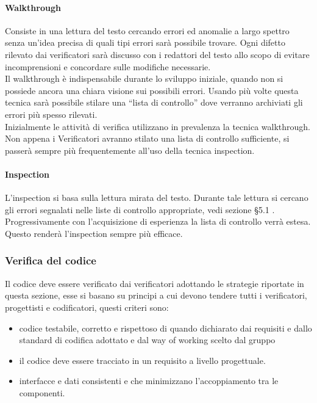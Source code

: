 			\paragraph{Walkthrough}
				Consiste in una lettura del testo cercando errori ed anomalie a largo spettro senza un’idea precisa di quali tipi errori sarà possibile trovare. Ogni difetto rilevato dai verificatori sarà discusso con i redattori del testo allo scopo di evitare incomprensioni e concordare sulle modifiche necessarie.\\
				Il walkthrough è indispensabile durante lo sviluppo iniziale, quando non si possiede ancora una chiara visione sui possibili errori. Usando più volte questa tecnica sarà possibile stilare una “lista di controllo” dove verranno archiviati gli errori più spesso rilevati. \\
				Inizialmente le attività di verifica utilizzano in prevalenza la tecnica walkthrough. Non appena i Verificatori avranno stilato una lista di controllo sufficiente, si passerà sempre più frequentemente all’uso della tecnica inspection.\\
			\paragraph{Inspection}
				L’inspection si basa sulla lettura mirata del testo. Durante tale lettura si cercano gli errori segnalati nelle liste di controllo appropriate, vedi sezione §5.1 . Progressivamente con l’acquisizione di esperienza la lista di controllo verrà estesa. Questo renderà l’inspection sempre più efficace.

		\subsubsection{Verifica del codice}
			Il codice deve essere verificato dai verificatori adottando le strategie riportate in questa sezione, esse si basano su principi a cui devono tendere tutti i verificatori, progettisti e codificatori, questi criteri sono:
			\begin{itemize}
				\item  codice testabile, corretto e rispettoso di quando dichiarato dai requisiti e dallo standard di codifica adottato e dal way of working scelto dal gruppo
				\item il codice deve essere tracciato in un requisito a livello progettuale. 
				\item interfacce e dati consistenti e che minimizzano l’accoppiamento tra le componenti.
			\end{itemize}
